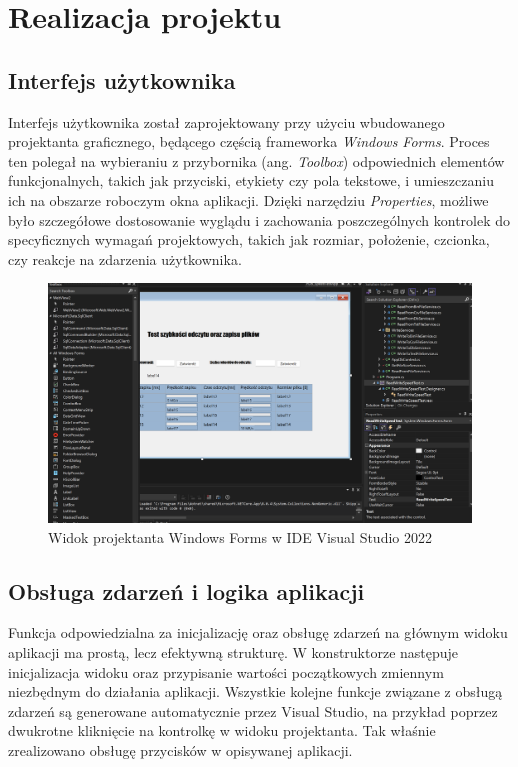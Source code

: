 \documentclass{report}
\begin{document}
\section{\LARGE Realizacja projektu}

\subsection{\Large Interfejs użytkownika}

Interfejs użytkownika został zaprojektowany przy użyciu wbudowanego projektanta graficznego, będącego częścią frameworka \textit{Windows Forms}. Proces ten polegał na wybieraniu z przybornika (ang. \textit{Toolbox}) odpowiednich elementów funkcjonalnych, takich jak przyciski, etykiety czy pola tekstowe, i umieszczaniu ich na obszarze roboczym okna aplikacji. Dzięki narzędziu \textit{Properties}, możliwe było szczegółowe dostosowanie wyglądu i zachowania poszczególnych kontrolek do specyficznych wymagań projektowych, takich jak rozmiar, położenie, czcionka, czy reakcje na zdarzenia użytkownika.

\begin{figure}
    \centering
    \includegraphics[width=1.0\textwidth]{src/interface-proj.png}
    \caption{Widok projektanta Windows Forms w IDE Visual Studio 2022}
\end{figure}


\subsection{\Large Obsługa zdarzeń i logika aplikacji}

Funkcja odpowiedzialna za inicjalizację oraz obsługę zdarzeń na głównym widoku aplikacji ma prostą, lecz efektywną strukturę. W konstruktorze następuje inicjalizacja widoku oraz przypisanie wartości początkowych zmiennym niezbędnym do działania aplikacji. Wszystkie kolejne funkcje związane z obsługą zdarzeń są generowane automatycznie przez Visual Studio, na przykład poprzez dwukrotne kliknięcie na kontrolkę w widoku projektanta. Tak właśnie zrealizowano obsługę przycisków w opisywanej aplikacji.
\end{document}
